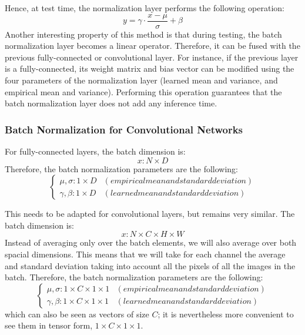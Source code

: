 Hence, at test time, the normalization layer performs the following operation:
\begin{equation*}
    y = \gamma\cdot\frac{x-\mu}{\sigma}+\beta
\end{equation*}
Another interesting property of this method is that during testing, the batch normalization layer becomes a linear operator. Therefore, it can be fused with the previous fully-connected or convolutional layer. For instance, if the previous layer is a fully-connected, its weight matrix and bias vector can be modified using the four parameters of the normalization layer (learned mean and variance, and empirical mean and variance). Performing this operation guarantees that the batch normalization layer does not add any inference time. 

\subsubsection{Batch Normalization for Convolutional Networks}
For fully-connected layers, the batch dimension is:
\begin{equation*}
    x: N\times D
\end{equation*}
Therefore, the batch normalization parameters are the following:
\begin{equation*}
    \begin{cases*}
        \mu, \sigma: 1\times D & (empirical mean and standard deviation)\\
        \gamma, \beta: 1\times D & (learned mean and standard deviation)
    \end{cases*}
\end{equation*}

This needs to be adapted for convolutional layers, but remains very similar. The batch dimension is:
\begin{equation*}
    x: N\times C\times H\times W
\end{equation*}
Instead of averaging only over the batch elements, we will also average over both spacial dimensions. This means that we will take for each channel the average and standard deviation taking into account all the pixels of all the images in the batch. Therefore, the batch normalization parameters are the following:
\begin{equation*}
    \begin{cases*}
        \mu, \sigma: 1\times C\times 1\times 1 & (empirical mean and standard deviation)\\
        \gamma, \beta: 1\times C\times 1\times 1 & (learned mean and standard deviation)
    \end{cases*}
\end{equation*}
which can also be seen as vectors of size $C$; it is nevertheless more convenient to see them in tensor form, $1\times C\times 1\times 1$.

